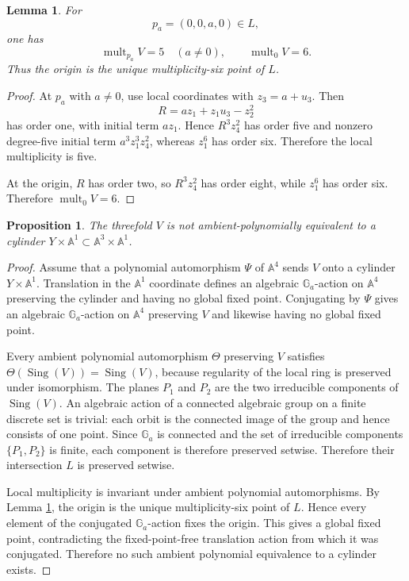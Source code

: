 \documentclass[11pt]{article}
\newtheorem{proposition}[theorem]{Proposition}
\newtheorem{lemma}[theorem]{Lemma}
\theoremstyle{definition}
\newcommand{\A}{\mathbb A}
\newcommand{\Sing}{\operatorname{Sing}}
\newcommand{\mult}{\operatorname{mult}}
\begin{document}
\begin{lemma}\label{lem:mult}
For
\[
p_a=(0,0,a,0)\in L,
\]
one has
\[
\mult_{p_a}V=5\quad(a\neq0),
\qquad
\mult_0V=6.
\]
Thus the origin is the unique multiplicity-six point of $L$.
\end{lemma}

\begin{proof}
At $p_a$ with $a\neq0$, use local coordinates with $z_3=a+u_3$. Then
\[
R=az_1+z_1u_3-z_2^2
\]
has order one, with initial term $az_1$. Hence $R^3z_4^2$ has order five and nonzero degree-five initial term $a^3z_1^3z_4^2$, whereas $z_1^6$ has order six. Therefore the local multiplicity is five.

At the origin, $R$ has order two, so $R^3z_4^2$ has order eight, while $z_1^6$ has order six. Therefore $\mult_0V=6$.
\end{proof}

\begin{proposition}\label{prop:notcyl}
The threefold $V$ is not ambient-polynomially equivalent to a cylinder $Y\times\A^1\subset\A^3\times\A^1$.
\end{proposition}

\begin{proof}
Assume that a polynomial automorphism $\Psi$ of $\A^4$ sends $V$ onto a cylinder $Y\times\A^1$. Translation in the $\A^1$ coordinate defines an algebraic $\mathbb G_a$-action on $\A^4$ preserving the cylinder and having no global fixed point. Conjugating by $\Psi$ gives an algebraic $\mathbb G_a$-action on $\A^4$ preserving $V$ and likewise having no global fixed point.

Every ambient polynomial automorphism $\Theta$ preserving $V$ satisfies $\Theta(\Sing(V))=\Sing(V)$, because regularity of the local ring is preserved under isomorphism. The planes $P_1$ and $P_2$ are the two irreducible components of $\Sing(V)$. An algebraic action of a connected algebraic group on a finite discrete set is trivial: each orbit is the connected image of the group and hence consists of one point. Since $\mathbb G_a$ is connected and the set of irreducible components $\{P_1,P_2\}$ is finite, each component is therefore preserved setwise. Therefore their intersection $L$ is preserved setwise.

Local multiplicity is invariant under ambient polynomial automorphisms. By Lemma \ref{lem:mult}, the origin is the unique multiplicity-six point of $L$. Hence every element of the conjugated $\mathbb G_a$-action fixes the origin. This gives a global fixed point, contradicting the fixed-point-free translation action from which it was conjugated. Therefore no such ambient polynomial equivalence to a cylinder exists.
\end{proof}
\end{document}
